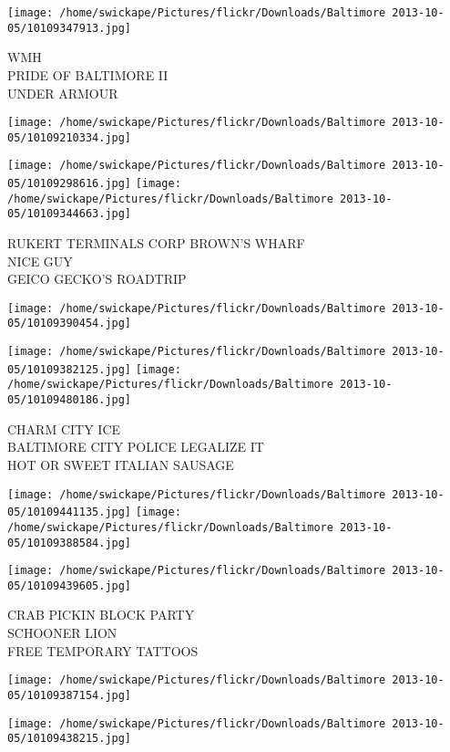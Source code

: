 \documentclass[10pt,letterpaper]{article}
\begin{document}
\texttt{[image: /home/swickape/Pictures/flickr/Downloads/Baltimore 2013-10-05/10109347913.jpg]}

WMH\\
PRIDE OF BALTIMORE II\\
UNDER ARMOUR
\pagebreak

\texttt{[image: /home/swickape/Pictures/flickr/Downloads/Baltimore 2013-10-05/10109210334.jpg]}

\vspace{0.25in}
\texttt{[image: /home/swickape/Pictures/flickr/Downloads/Baltimore 2013-10-05/10109298616.jpg]}
\texttt{[image: /home/swickape/Pictures/flickr/Downloads/Baltimore 2013-10-05/10109344663.jpg]}

RUKERT TERMINALS CORP BROWN'S WHARF\\
NICE GUY\\
GEICO GECKO'S ROADTRIP
\pagebreak

\texttt{[image: /home/swickape/Pictures/flickr/Downloads/Baltimore 2013-10-05/10109390454.jpg]}

\vspace{0.25in}
\texttt{[image: /home/swickape/Pictures/flickr/Downloads/Baltimore 2013-10-05/10109382125.jpg]}
\texttt{[image: /home/swickape/Pictures/flickr/Downloads/Baltimore 2013-10-05/10109480186.jpg]}

CHARM CITY ICE\\
BALTIMORE CITY POLICE LEGALIZE IT\\
HOT OR SWEET ITALIAN SAUSAGE
\pagebreak

\texttt{[image: /home/swickape/Pictures/flickr/Downloads/Baltimore 2013-10-05/10109441135.jpg]}
\texttt{[image: /home/swickape/Pictures/flickr/Downloads/Baltimore 2013-10-05/10109388584.jpg]}

\texttt{[image: /home/swickape/Pictures/flickr/Downloads/Baltimore 2013-10-05/10109439605.jpg]}

CRAB PICKIN BLOCK PARTY\\
SCHOONER LION\\
FREE TEMPORARY TATTOOS
\pagebreak

\texttt{[image: /home/swickape/Pictures/flickr/Downloads/Baltimore 2013-10-05/10109387154.jpg]}

\vspace{0.25in}
\texttt{[image: /home/swickape/Pictures/flickr/Downloads/Baltimore 2013-10-05/10109438215.jpg]}
\end{document}
